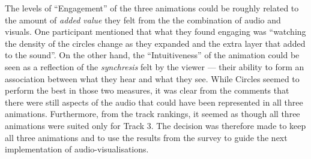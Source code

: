 \documentclass[../initial_thesis.tex]{subfiles}
\begin{document}
The levels of ``Engagement'' of the three animations could be roughly related to the amount of \emph{added value} they felt from the the combination of audio and visuals. One participant mentioned that what they found engaging was ``watching the density of the circles change as they expanded and the extra layer that added to the sound''. On the other hand, the ``Intuitiveness'' of the animation could be seen as a reflection of the \emph{synchresis} felt by the viewer --- their ability to form an association between what they hear and what they see. While Circles seemed to perform the best in those two measures, it was clear from the comments that there were still aspects of the audio that could have been represented in all three animations. Furthermore, from the track rankings, it seemed as though all three animations were suited only for Track 3. The decision was therefore made to keep all three animations and to use the results from the survey to guide the next implementation of audio-visualisations.
\end{document}
